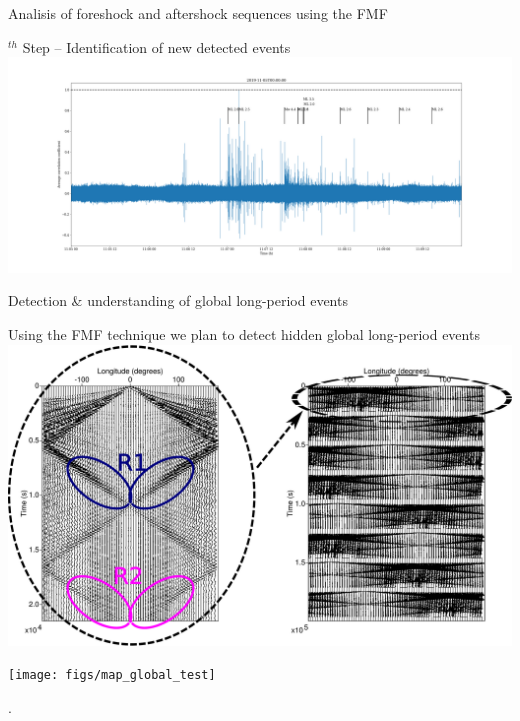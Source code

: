 \documentclass[aspectratio=43,9pt]{beamer}
\begin{document}
\begin{frame}{Analisis of foreshock and aftershock sequences using the FMF}

  \hskip -1.7cm \begin{minipage}{1\linewidth}
    $^{th}$ Step -- Identification of new detected events \\
    \vskip 0.4cm
    \centering \includegraphics[width=1.3\linewidth]{figs/5_correlation_coefficients_with_events}
  \end{minipage}

\end{frame}



\begin{frame}{Detection \& understanding of global long-period events}

   \vskip -0.3cm
   \centering Using the FMF technique we plan to detect hidden global long-period events \\
   \vskip 0.3cm
   \includegraphics[width=1\linewidth]{figs/mixed_src_lat0_lon0-360} \\
   \begin{minipage}{0.4\linewidth}
    \vskip -0.9cm \hskip 0.2cm \texttt{[image: figs/map\_global\_test]}   
   \end{minipage}
   \begin{minipage}{0.55\linewidth}
    .
   \end{minipage}


\end{frame}
\end{document}
